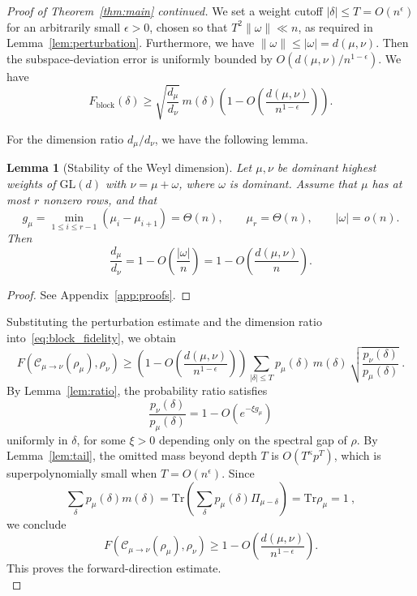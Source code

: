 \documentclass[a4paper,onecolumn,11pt]{quantumarticle}
\newtheorem{lem}{Lemma}
\newcommand*{\Tr}{\mathrm{Tr}}
\def\C{\mathcal{C}}
\begin{document}
\begin{proof}[Proof of Theorem~\ref{thm:main} continued]
We set a weight cutoff \( |\delta|\le T = O(n^\epsilon)\) for an arbitrarily small
\(\epsilon>0\), chosen so that \(T^2\|\omega\|\ll n\), as required in
Lemma~\ref{lem:perturbation}. Furthermore, we have $\|\omega\|\le|\omega|=d(\mu,\nu)$. Then the subspace-deviation error is uniformly bounded by
\(O(d(\mu,\nu)/n^{1-\epsilon})\). We have
\begin{equation}
    F_{\mathrm{block}}(\delta) \ge
    \sqrt{\frac{d_\mu}{d_\nu}}\,
    m(\delta)\left(
        1-O\left(\frac{d(\mu,\nu)}{n^{1-\epsilon}}\right)
    \right).
\end{equation}

For the dimension ratio $d_\mu/d_\nu$,  we have the following lemma.
\begin{lem}[Stability of the Weyl dimension]\label{lem:dim_ratio}
Let \(\mu,\nu\) be dominant highest weights of \(\mathrm{GL}(d)\) with
\(\nu=\mu+\omega\), where \(\omega\) is dominant. Assume that \(\mu\) has at most \(r\) nonzero rows, and that
\[
g_\mu=\min_{1\le i\le r-1}(\mu_i-\mu_{i+1})=\Theta(n),
\qquad
\mu_r=\Theta(n),
\qquad
|\omega|=o(n).
\]
Then
\begin{equation}
    \frac{d_\mu}{d_\nu}
    =
    1-O\!\left(\frac{|\omega|}{n}\right)
    =
    1-O\!\left(\frac{d(\mu,\nu)}{n}\right).
\end{equation}
\end{lem}
\begin{proof}
    See Appendix~\ref{app:proofs}.
\end{proof}


Substituting the perturbation estimate and the dimension ratio into~\eqref{eq:block_fidelity}, we obtain
\begin{equation}
    F(\C_{\mu\to\nu}(\rho_\mu),\rho_\nu)
    \ge
    \left(
        1-O\!\left(\frac{d(\mu,\nu)}{n^{1-\epsilon}}\right)
    \right)
    \sum_{|\delta|\le T}
    p_\mu(\delta)\,m(\delta)\,
    \sqrt{\frac{p_\nu(\delta)}{p_\mu(\delta)}} \ .
\end{equation}
By Lemma~\ref{lem:ratio}, the probability ratio satisfies
\[
\frac{p_\nu(\delta)}{p_\mu(\delta)}
=
1-O\!\left(e^{-\xi g_\mu}\right)
\]
uniformly in \(\delta\), for some \(\xi>0\) depending only on the spectral gap of \(\rho\).
By Lemma~\ref{lem:tail}, the omitted mass beyond depth \(T\) is
\(O(T^\kappa p^T)\), which is superpolynomially small when \(T=O(n^\epsilon)\). Since
\begin{equation}
    \sum_{\delta} p_\mu(\delta)m(\delta) 
    = \Tr\!\left(\sum_\delta p_\mu(\delta)\Pi_{\mu-\delta}\right)
    = \Tr \rho_\mu = 1\ ,
\end{equation}
we conclude
\begin{equation}
    F(\C_{\mu\to\nu}(\rho_\mu),\rho_\nu)
    \ge
    1-O\!\left(\frac{d(\mu,\nu)}{n^{1-\epsilon}}\right).
\end{equation}
This proves the forward-direction estimate.\\


\end{proof}
\end{document}
